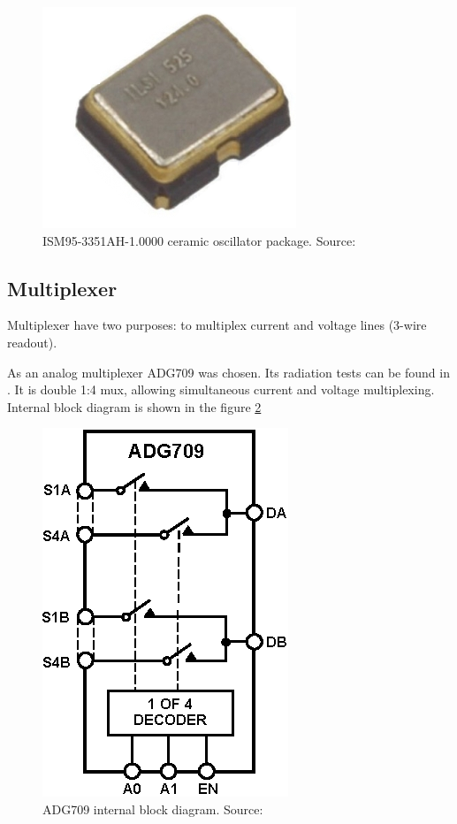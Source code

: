         \begin{figure}[H]
            \centering
            \includegraphics[width=0.5\paperwidth]{img/06/ISM95.png}
            \caption{ISM95-3351AH-1.0000 ceramic oscillator package. Source: \cite{ISM95_series_datasheet}}
            \label{ISM95-3351AH-1.0000}
        \end{figure}


    \subsection{Multiplexer}
        Multiplexer have two purposes: to multiplex current and voltage lines (3-wire readout).

        As an analog multiplexer ADG709 was chosen. Its radiation tests can be found in \cite{IEEE_radiation_tests_1992_2009}. It is double 1:4 mux, allowing simultaneous current and voltage multiplexing. Internal block diagram is shown in the figure \ref{ADG709_block}

        \begin{figure}[H]
            \centering
            \includegraphics[width=0.3\paperwidth]{img/06/ADG709.eps}
            \caption{ADG709 internal block diagram. Source: \cite{ADG709_datasheet}}
            \label{ADG709_block}
        \end{figure}

